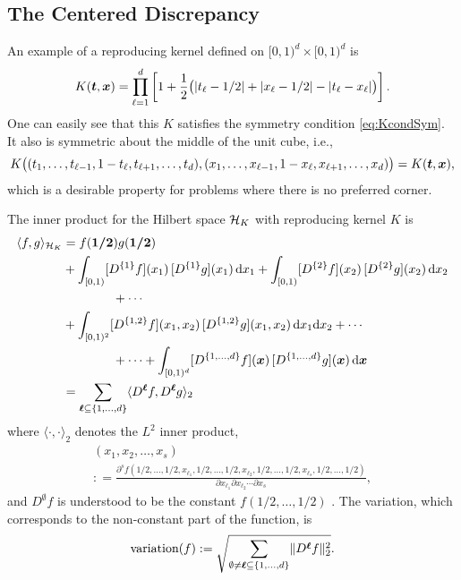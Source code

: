 \documentclass{svproc}
\begin{document}
\subsection{The Centered Discrepancy}
An example of a reproducing kernel defined on $[0,1)^d \times [0,1)^d$ is
\begin{equation} \label{eq:ctrkernel}
	K({\boldsymbol{t}},{\boldsymbol{x}}) = \prod_{\ell = 1}^d \left[ 1 + \frac 12 \bigl ( \lvert t_\ell - 1/2 \rvert + \lvert x_\ell - 1/2 \rvert - \lvert t_\ell - x_\ell \rvert \bigr ) \right] .
\end{equation}
One can easily see that this $K$ satisfies the symmetry condition \eqref{eq:KcondSym}.  It also is symmetric about the middle of the unit cube, i.e.,
\begin{equation*}
	K\bigl((t_1,\ldots, t_{\ell-1}, 1 - t_\ell,  t_{\ell+1}, \ldots, t_d),
	(x_1,\ldots, x_{\ell-1}, 1 - x_\ell,  x_{\ell+1}, \ldots, x_d)
	\bigr) =
	K({\boldsymbol{t}},{\boldsymbol{x}}),
\end{equation*}
which is a desirable property for problems where there is no preferred corner.

The inner product for the Hilbert space ${\mathcal{H}}_K$ with reproducing kernel $K$ is
\begin{align}
	\langle f, g \rangle_{{\mathcal{H}}_K} &= f(\boldsymbol{1/2}) g(\boldsymbol{1/2}) \nonumber
	\\
	&
	+ \int_{[0,1)} [D^{\{1\}}f](x_1) \, [D^{\{1\}}g](x_1)\, \mathrm{d} x_1
	+ \int_{[0,1)} [D^{\{2\}}f](x_2) \, [D^{\{2\}}g](x_2)\, \mathrm{d} x_2 \nonumber \\
	& \qquad \qquad + \cdots \nonumber\\
	&
	+ \int_{[0,1)^2} [D^{{\{1,2\}}}f](x_1,x_2) \, [D^{\{1,2\}}g](x_1,x_2)\, \mathrm{d} x_1 \mathrm{d} x_2 + \cdots \nonumber \\
	&  \qquad \qquad + \cdots + \int_{[0,1)^d} [D^{\{1,\ldots, d\}}f]({\boldsymbol{x}}) \, [D^{\{1,\ldots, d\}}g]({\boldsymbol{x}}) \, \mathrm{d} {\boldsymbol{x}} \nonumber \\
	& = \sum_{{\boldsymbol{\ell}} \subseteq \{1, \ldots, d\}} \langle D^{{\boldsymbol{\ell}}}f, D^{{\boldsymbol{\ell}}}g \rangle_2
\end{align}
where $\langle \cdot,\cdot \rangle_2$ denotes the $L^2$ inner product,
\begin{multline*}
	[D^{\{\ell_1, \ell_2, \ldots, \ell_s\} }f](x_1, x_2, \ldots, x_s) \\
	: = \frac{\partial^s f(1/2,\ldots, 1/2, x_{\ell_1}, 1/2, \ldots, 1/2, x_{\ell_2}, 1/2, \ldots, 1/2, x_{\ell_s}, 1/2, \ldots, 1/2)}{\partial x_{\ell_1} \partial x_{\ell_2} \cdots \partial x_s},
\end{multline*}
and $D^{\emptyset}f$ is understood to be the constant $f(1/2, \ldots, 1/2)$ \cite{Hic97a}.  The variation, which corresponds to the non-constant part of the function, is
\begin{equation*}
		\text{variation}(f) := \sqrt{\sum_{\emptyset \ne {\boldsymbol{\ell}} \subseteq \{1, \ldots, d\}} \lVert D^{{\boldsymbol{\ell}}}f\rVert_2^2}.
\end{equation*}
\end{document}
